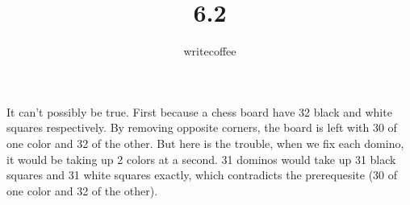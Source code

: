 \documentclass[11pt]{article}
\author{writecoffee}
\title{6.2}
\begin{document}
\maketitle

{\setlength{\baselineskip}{1\baselineskip}
\setlength{\parindent}{0pt}
\setlength{\parskip}{2ex plus 0.5ex minus 0.2ex}
	It can't possibly be true. First because a chess board have 32 black and white squares respectively. %
	By removing opposite corners, the board is left with 30 of one color and 32 of the other. But here is %
	the trouble, when we fix each domino, it would be taking up 2 colors at a second. 31 dominos would %
	take up 31 black squares and 31 white squares exactly, which contradicts the prerequesite %
	(30 of one color and 32 of the other).
\par}
\end{document}
